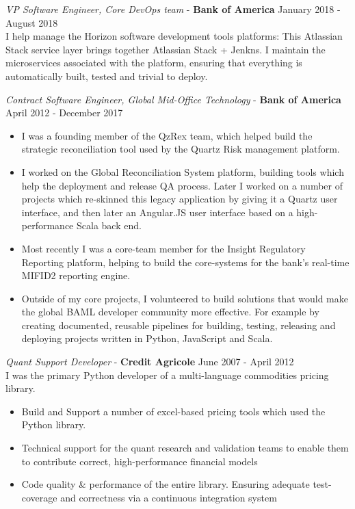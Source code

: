 \documentclass[margin, 10pt]{res} %
\begin{document}
\begin{resume}
        {\sl VP Software Engineer, Core DevOps team} - \textbf{Bank of America} \hfill January 2018 - August 2018 \\

        I help manage the Horizon software development tools platforms: This Atlassian Stack service layer
        brings together Atlassian Stack + Jenkns. I maintain the
        microservices associated with the platform, ensuring that everything is automatically built,
        tested and trivial to deploy.

        {\sl Contract Software Engineer, Global Mid-Office Technology} - \textbf{Bank of America} \hfill April 2012 - December 2017 \\

        \begin{itemize}
            \item I was a founding member of the QzRex team, which helped build the strategic reconciliation tool used by the Quartz Risk management platform.
            \item I worked on the Global Reconciliation System platform, building tools which help the deployment and release QA process. Later I worked on a number of projects which re-skinned this legacy application by giving it a Quartz user interface, and then later an Angular.JS user interface based on a high-performance Scala back end.
            \item Most recently I was a core-team member for the Insight Regulatory Reporting platform, helping to build the core-systems for the bank's real-time MIFID2 reporting engine.
            \item Outside of my core projects, I volunteered to build solutions that would make the global BAML developer community more effective. For example by creating documented, reusable pipelines for building, testing, releasing and deploying projects written in Python, JavaScript and Scala.
        \end{itemize}

        {\sl Quant Support Developer} - \textbf{Credit Agricole} \hfill June 2007 - April 2012 \\

        I was the primary Python developer of a multi-language commodities pricing library.

        \begin{itemize}
            \item Build and Support a number of excel-based pricing tools which used the Python library.
            \item Technical support for the quant research and validation teams to enable them to contribute correct, high-performance financial models
            \item Code quality \& performance of the entire library. Ensuring adequate test-coverage and correctness via a continuous integration system
        \end{itemize}


\end{resume}
\end{document}
